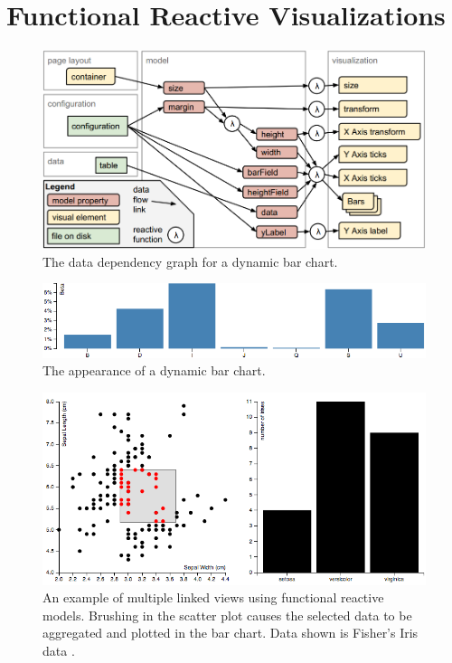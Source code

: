 \section{Functional Reactive Visualizations}
\begin{figure}[h]
  \caption{The data dependency graph for a dynamic bar chart.}
  \centering
  \includegraphics[width=\textwidth]{figures/barChartFlow.png}
\end{figure}
\begin{figure}[h]
  \caption{The appearance of a dynamic bar chart.}
  \centering
  \includegraphics[width=\textwidth]{figures/barChart.png}
\end{figure}
\begin{figure}[h]
  \caption{An example of multiple linked views using functional reactive models. Brushing in the scatter plot causes the selected data to be aggregated and plotted in the bar chart. Data shown is Fisher's Iris data \cite{fisher1936use}. }
  \centering
  \includegraphics[width=\textwidth]{figures/linkedViews.png}
\end{figure}
